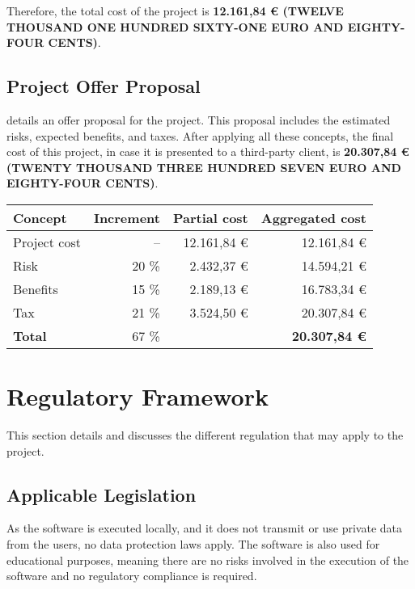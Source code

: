 Therefore, the total cost of the project is \textbf{12.161,84 € (TWELVE THOUSAND ONE HUNDRED SIXTY-ONE EURO AND EIGHTY-FOUR CENTS)}.


\subsection{Project Offer Proposal}\label{subsec:offer-proposal}
 details an offer proposal for the project. This proposal includes the estimated risks, expected benefits, and taxes. After applying all these concepts, the final cost of this project, in case it is presented to a third-party client, is \textbf{20.307,84 € (TWENTY THOUSAND THREE HUNDRED SEVEN EURO AND EIGHTY-FOUR CENTS)}.

\begin{table}[htb]
    {
      \begin{tabular}{lrrr}
        \toprule
        \textbf{Concept} & \textbf{Increment} & \textbf{Partial cost} & \textbf{Aggregated cost} \\
        \midrule
        Project cost   & --    & 12.161,84 € & 12.161,84 € \\
        Risk           & 20 \% &  2.432,37 € & 14.594,21 € \\
        Benefits       & 15 \% &  2.189,13 € & 16.783,34 € \\
        Tax            & 21 \% &  3.524,50 € & 20.307,84 € \\
        \midrule
        \textbf{Total} & 67 \% & & \textbf{20.307,84 €} \\
        \bottomrule
      \end{tabular}
    }
\end{table}



\section{Regulatory Framework}\label{sec:regulation}
This section details and discusses the different regulation that may apply to the project.

\subsection{Applicable Legislation}\label{subsec:legislation}
As the software is executed locally, and it does not transmit or use private data from the users, no data protection laws apply. The software is also used for educational purposes, meaning there are no risks involved in the execution of the software and no regulatory compliance is required.


